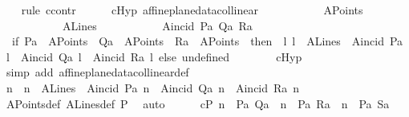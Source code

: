 \begin{isabellebody}
\ \ \isamarkupfalse%
\ {\isacharparenleft}{\kern0pt}rule\ ccontr{\isacharparenright}{\kern0pt}\isanewline
\ \ \ \ \isamarkupfalse%
\ cHyp{\isacharcolon}{\kern0pt}\ {\isachardoublequoteopen}{\isasymnot}{\isasymnot}affine{\isacharunderscore}{\kern0pt}plane{\isacharunderscore}{\kern0pt}data{\isachardot}{\kern0pt}collinear\isanewline
\ \ \ \ \ \ \ \ \ \ \ A{}Points\isanewline
\ \ \ \ \ \ \ \ \ \ \ A{}Lines\isanewline
\ \ \ \ \ \ \ \ \ \ \ A{}incid\ Pa\ Qa\ Ra{\isachardoublequoteclose}\isanewline
\ \ \ \ \isamarkupfalse%
\ {}{\isacharcolon}{\kern0pt}\ {\isachardoublequoteopen}{\isacharparenleft}{\kern0pt}if\ Pa\ {\isasymin}\ A{}Points\ {\isasymand}\ Qa\ {\isasymin}\ A{}Points\ {\isasymand}\ Ra\ {\isasymin}\ A{}Points\ \ then\ {\isacharparenleft}{\kern0pt}{\isasymexists}\ l{\isachardot}{\kern0pt}\ l\ {\isasymin}\ A{}Lines\ {\isasymand}\ A{}incid\ Pa\ l\ {\isasymand}\ A{}incid\ Qa\ l\ {\isasymand}\ A{}incid\ Ra\ l{\isacharparenright}{\kern0pt}\ else\ undefined{\isacharparenright}{\kern0pt}{\isachardoublequoteclose}\isanewline
\ \ \ \ \ \ \isamarkupfalse%
\ cHyp\ \isamarkupfalse%
\ {\isacharparenleft}{\kern0pt}simp\ add{\isacharcolon}{\kern0pt}\ affine{\isacharunderscore}{\kern0pt}plane{\isacharunderscore}{\kern0pt}data{\isachardot}{\kern0pt}collinear{\isacharunderscore}{\kern0pt}def{\isacharparenright}{\kern0pt}\isanewline
\ \ \ \ \isamarkupfalse%
\ \isamarkupfalse%
\ n\ \ {}{\isacharcolon}{\kern0pt}{\isachardoublequoteopen}n\ {\isasymin}\ A{}Lines\ {\isasymand}\ A{}incid\ Pa\ n\ {\isasymand}\ A{}incid\ Qa\ n\ {\isasymand}\ A{}incid\ Ra\ n{\isachardoublequoteclose}\ \isamarkupfalse%
\ A{}Points{\isacharunderscore}{\kern0pt}def\ A{}Lines{\isacharunderscore}{\kern0pt}def\ P{}\ \isamarkupfalse%
\ auto\isanewline
\ \ \ \ \isamarkupfalse%
\ cP{\isacharcolon}{\kern0pt}\ {\isachardoublequoteopen}{\isacharparenleft}{\kern0pt}n\ {\isacharequal}{\kern0pt}\ {\isacharbraceleft}{\kern0pt}Pa{\isacharcomma}{\kern0pt}\ Qa{\isacharbraceright}{\kern0pt}{\isacharparenright}{\kern0pt}\ {\isasymor}\ {\isacharparenleft}{\kern0pt}n\ {\isacharequal}{\kern0pt}\ {\isacharbraceleft}{\kern0pt}Pa{\isacharcomma}{\kern0pt}\ Ra{\isacharbraceright}{\kern0pt}{\isacharparenright}{\kern0pt}\ {\isasymor}\ {\isacharparenleft}{\kern0pt}n\ {\isacharequal}{\kern0pt}\ {\isacharbraceleft}{\kern0pt}Pa{\isacharcomma}{\kern0pt}\ Sa{\isacharbraceright}{\kern0pt}{\isacharparenright}{\kern0pt}{\isachardoublequoteclose}\ \ \isanewline

\end{isabellebody}
